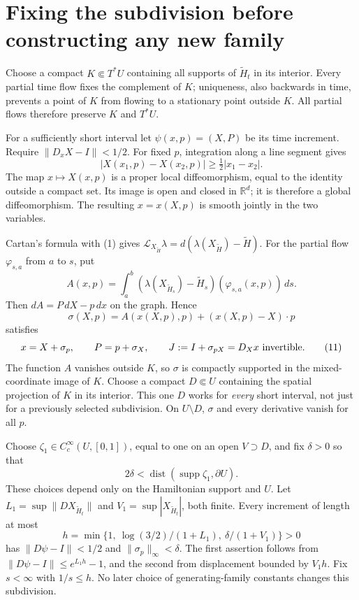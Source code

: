 \documentclass[11pt]{article}
\newcommand{\R}{\mathbb R}
\newcommand{\supp}{\operatorname{supp}}
\begin{document}
\section{Fixing the subdivision before constructing any new family}

Choose a compact \(K\Subset T^*U\) containing all supports of
\(\widetilde H_t\) in its interior. Every partial time flow fixes
the complement of \(K\); uniqueness, also backwards in time,
prevents a point of \(K\) from flowing to a stationary point outside
\(K\). All partial flows therefore preserve \(K\) and \(T^*U\).

For a sufficiently short interval let
\(\psi(x,p)=(X,P)\) be its time increment.
Require \(\|D_xX-I\|<1/2\). For fixed \(p\), integration along a
line segment gives
\[
 |X(x_1,p)-X(x_2,p)|\geq\tfrac12|x_1-x_2|.
 \tag{8}
\]
The map \(x\mapsto X(x,p)\) is a proper local diffeomorphism,
equal to the identity outside a compact set. Its image is open and
closed in \(\R^d\); it is therefore a global diffeomorphism.
The resulting \(x=x(X,p)\) is smooth jointly in the two variables.

Cartan's formula with (1) gives
\(\mathcal L_{X_{\widetilde H}}\lambda
=d(\lambda(X_{\widetilde H})-\widetilde H)\).
For the partial flow \(\varphi_{s,a}\) from \(a\) to \(s\), put
\[
 A(x,p)=\int_a^b
       (\lambda(X_{\widetilde H_s})-\widetilde H_s)
                    (\varphi_{s,a}(x,p))\,ds.
 \tag{9}
\]
Then \(dA=P\,dX-p\,dx\) on the graph. Hence
\[
 \sigma(X,p)=A(x(X,p),p)+(x(X,p)-X)\cdot p
 \tag{10}
\]
satisfies
\[
 x=X+\sigma_p,\qquad P=p+\sigma_X,\qquad
 J:=I+\sigma_{pX}=D_Xx\ \hbox{invertible}.
 \tag{11}
\]
The function \(A\) vanishes outside \(K\), so \(\sigma\) is
compactly supported in the mixed-coordinate image of \(K\).
Choose a compact \(D\Subset U\) containing the spatial projection
of \(K\) in its interior. This one \(D\) works for \emph{every}
short interval, not just for a previously selected subdivision.
On \(U\setminus D\), \(\sigma\) and every derivative vanish for
all \(p\).

Choose \(\zeta_1\in C^\infty_c(U,[0,1])\), equal to one on an
open \(V\supset D\), and fix \(\delta>0\) so that
\[
 2\delta<\operatorname{dist}(\supp\zeta_1,\partial U).
 \tag{12}
\]
These choices depend only on the Hamiltonian support and \(U\).
Let \(L_1=\sup\|DX_{\widetilde H_t}\|\) and
\(V_1=\sup|X_{\widetilde H_t}|\), both finite.
Every increment of length at most
\[
 h=\min\{1,\ \log(3/2)/(1+L_1),\ \delta/(1+V_1)\}>0
 \tag{13}
\]
has \(\|D\psi-I\|<1/2\) and \(\|\sigma_p\|_\infty<\delta\).
The first assertion follows from
\(\|D\psi-I\|\leq e^{L_1h}-1\), and the second from displacement
bounded by \(V_1h\). Fix \(s<\infty\) with \(1/s\leq h\).
No later choice of generating-family constants changes this subdivision.
\end{document}
